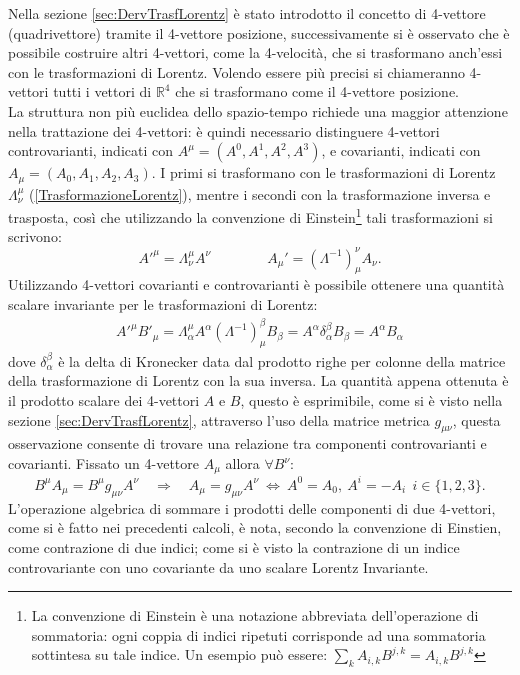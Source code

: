
Nella sezione \ref{sec:DervTrasfLorentz} è stato introdotto il concetto di 4-vettore (quadrivettore) tramite il 4-vettore posizione, successivamente si è osservato che è possibile costruire altri 4-vettori, come la 4-velocità, che si trasformano anch'essi con le trasformazioni di Lorentz. Volendo essere più precisi si chiameranno 4-vettori tutti i vettori di $\mathbb{R}^4$ che si trasformano come il 4-vettore posizione.\\ 
La struttura non più euclidea dello spazio-tempo richiede una maggior attenzione nella trattazione dei 4-vettori: è quindi necessario distinguere 4-vettori controvarianti, indicati con $A^{\mu}=(A^0,A^1,A^2,A^3)$, e covarianti, indicati con $A_{\mu}=(A_0,A_1,A_2,A_3)$. I primi si trasformano con le trasformazioni di Lorentz $\Lambda_\nu^\mu$ (\ref{TrasformazioneLorentz}), mentre i secondi con la trasformazione inversa e trasposta, così che utilizzando la convenzione di Einstein\footnote{La convenzione di Einstein è una notazione abbreviata dell'operazione di sommatoria: ogni coppia di indici ripetuti corrisponde ad una sommatoria sottintesa su tale indice. Un esempio può essere: $\sum_k A_{i,k}B^{j,k}= A_{i,k}B^{j,k}$} tali trasformazioni si scrivono:
\begin{equation}
    A'^\mu =\Lambda_\nu^\mu A^\nu \qquad \qquad A_\mu '=(\Lambda^{-1} )^\nu_\mu A_\nu.
\end{equation}
Utilizzando 4-vettori covarianti e controvarianti è possibile ottenere una quantità scalare invariante per le trasformazioni di Lorentz:
\begin{eqnarray*}
    A'^\mu B'_\mu=\Lambda_\alpha^\mu A^\alpha (\Lambda^{-1} )^\beta_\mu B_\beta=A^\alpha \delta_\alpha^\beta B_\beta=A^\alpha B_\alpha
\end{eqnarray*}
dove $ \delta_\alpha^\beta$ è la delta di Kronecker data dal prodotto righe per colonne della matrice della trasformazione di Lorentz con la sua inversa. La quantità appena ottenuta è il prodotto scalare dei 4-vettori $A$ e $B$, questo è esprimibile, come si è visto nella sezione \ref{sec:DervTrasfLorentz}, attraverso l'uso della matrice metrica $g_{\mu \nu}$, questa osservazione consente di trovare una relazione tra componenti controvarianti e covarianti. Fissato un 4-vettore $A_\mu$ allora $\forall B^\nu$: 
\begin{equation}
    B^\mu A_\mu=B^\mu g_{\mu\nu} A^\nu \quad \Rightarrow\quad A_\mu=g_{\mu\nu}A^\nu \ \Leftrightarrow\ A^0=A_0,\ A^i=-A_i \ \ i\in\{1,2,3\}.
\end{equation}
L'operazione algebrica di sommare i prodotti delle componenti di due 4-vettori, come si è fatto nei precedenti calcoli, è nota, secondo la convenzione di Einstien, come contrazione di due indici; come si è visto la contrazione di un indice controvariante con uno covariante da uno scalare Lorentz Invariante.\\

